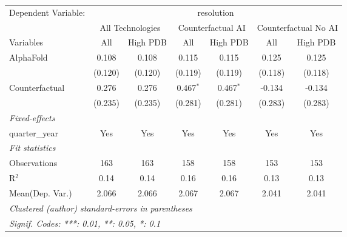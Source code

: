 \begingroup
\centering
\begin{tabular}{lcccccc}
   \tabularnewline \midrule \midrule
   Dependent Variable: & \multicolumn{6}{c}{resolution}\\
 & \multicolumn{2}{c}{All Technologies} & \multicolumn{2}{c}{Counterfactual AI} & \multicolumn{2}{c}{Counterfactual No AI} \\
\cmidrule(lr){1-1}\cmidrule(lr){2-3} \cmidrule(lr){4-5} \cmidrule(lr){6-7}
Variables & \multicolumn{1}{c}{All} & \multicolumn{1}{c}{High PDB} & \multicolumn{1}{c}{All} & \multicolumn{1}{c}{High PDB} & \multicolumn{1}{c}{All} & \multicolumn{1}{c}{High PDB} \\
\cmidrule(lr){1-1}\cmidrule(lr){2-2} \cmidrule(lr){3-3} \cmidrule(lr){4-4} \cmidrule(lr){5-5} \cmidrule(lr){6-6} \cmidrule(lr){7-7}
   AlphaFold      & 0.108   & 0.108   & 0.115       & 0.115       & 0.125   & 0.125\\   
                  & (0.120) & (0.120) & (0.119)     & (0.119)     & (0.118) & (0.118)\\   
   Counterfactual & 0.276   & 0.276   & 0.467$^{*}$ & 0.467$^{*}$ & -0.134  & -0.134\\   
                  & (0.235) & (0.235) & (0.281)     & (0.281)     & (0.283) & (0.283)\\   
   \midrule
   \emph{Fixed-effects}\\
   quarter\_year  & Yes     & Yes     & Yes         & Yes         & Yes     & Yes\\  
   \midrule
   \emph{Fit statistics}\\
   Observations   & 163     & 163     & 158         & 158         & 153     & 153\\  
   R$^2$          & 0.14    & 0.14    & 0.16        & 0.16        & 0.13    & 0.13\\  
Mean(Dep. Var.) & 2.066 & 2.066 & 2.067 & 2.067 & 2.041 & 2.041 \\
   \midrule \midrule
   \multicolumn{7}{l}{\emph{Clustered (author) standard-errors in parentheses}}\\
   \multicolumn{7}{l}{\emph{Signif. Codes: ***: 0.01, **: 0.05, *: 0.1}}\\
\end{tabular}
\par\endgroup
